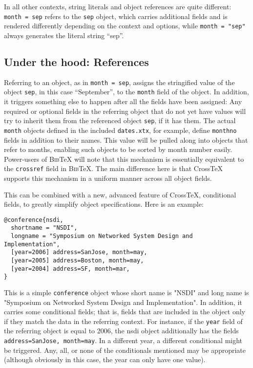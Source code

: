 \documentclass{article}
\newcommand{\XTeX}{Cross\TeX}
\newcommand{\BibTeX}{\textsc{Bib}\TeX}
\begin{document}
In all other contexts, string literals and object references are quite different: \texttt{month = sep} refers to the \texttt{sep} object, which carries additional fields and is rendered differently depending on the context and options, while \texttt{month = "sep"} always generates the literal string ``sep''.

\subsection{Under the hood: References}

Referring to an object, as in \texttt{month = sep}, assigns the stringified value of the object \texttt{sep}, in this case ``September'', to the \texttt{month} field of the object. In addition, it triggers something else to happen after all the fields have been assigned: Any required or optional fields in the referring object that do not yet have values will try to inherit them from the referenced object \texttt{sep}, if it has them. The actual \texttt{month} objects defined in the included \texttt{dates.xtx}, for example, define \texttt{monthno} fields in addition to their names. This value will be pulled along into objects that refer to months, enabling such objects to be sorted by month number easily. Power-users of \BibTeX{} will note that this mechanism is essentially equivalent to the \texttt{crossref} field in \BibTeX{}. The main difference here is that \XTeX{} supports this mechanism in a uniform manner across all object fields.

This can be combined with a new, advanced feature of \XTeX{}, conditional fields, to greatly simplify object specifications. Here is an example:

\begin{small}\begin{verbatim}
@conference{nsdi,
  shortname = "NSDI",
  longname = "Symposium on Networked System Design and Implementation", 
  [year=2006] address=SanJose, month=may,
  [year=2005] address=Boston, month=may,
  [year=2004] address=SF, month=mar,
}
\end{verbatim}\end{small}

This is a simple \texttt{conference} object whose short name is "NSDI"
and long name is "Symposium on Networked System Design and
Implementation". In addition, it carries some conditional fields; that is, 
fields that are included in the object only if they match the data in the
referring context. For instance, if the \texttt{year} field of the referring object is equal to 2006, the nsdi object additionally has the fields \texttt{address=SanJose, month=may}. In a different year, a different conditional might be triggered. Any, all, or none of the conditionals mentioned may be appropriate (although obviously in this case, the year can only have one value).
\end{document}

